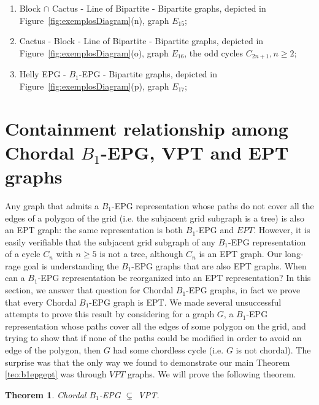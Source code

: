 \documentclass[9pt]{entcs}
\newtheorem{teo}[thm]{Theorem}%
\begin{document}
\begin{enumerate}[label=(\arabic*)]
      \item Block $\cap$  Cactus -  Line of Bipartite - Bipartite graphs, depicted in Figure~\ref{fig:exemplosDiagram}(n), graph $E_{15}$;%
      \item Cactus - Block -  Line of Bipartite - Bipartite graphs, depicted in Figure~\ref{fig:exemplosDiagram}(o), graph $E_{16}$, the odd cycles $C_{2n+1},n\geq 2$;%
      \item Helly EPG - $B_1$-EPG  - Bipartite graphs, depicted in Figure~\ref{fig:exemplosDiagram}(p), graph  $E_{17}$;%
\end{enumerate}








\section{Containment relationship among Chordal $B_1$-EPG, VPT and EPT graphs }


 Any graph that
admits a $B_1$-EPG representation  whose paths do not cover all the edges of a polygon of the grid (i.e.
the subjacent grid subgraph is a tree)  is also an EPT graph: the same representation is both $B_1$-EPG and $EPT$.
However, it is easily verifiable that the subjacent grid subgraph of any $B_1$-EPG representation of a cycle $C_n$ with $n\geq 5$ is not a tree,
although $C_n$ is an  EPT graph.  Our long-rage goal is 
understanding the $B_1$-EPG graphs that are also EPT graphs. When can a $B_1$-EPG representation
be reorganized into an EPT representation?  In this section,
 we answer that question for Chordal $B_1$-EPG graphs, in fact we prove that every Chordal $B_1$-EPG graph is EPT. We
 made several unsuccessful attempts to prove this result by considering for a graph $G$, a $B_1$-EPG representation whose paths cover all the edges
 of some polygon on the grid, and trying  to show  that if none of the paths could be modified in order to avoid an edge of the polygon,
 then $G$ had some chordless  cycle (i.e. $G$ is not chordal). The surprise was that the only way we found to demonstrate our main Theorem \ref{teo:b1epgept} was through $VPT$ graphs.
 We will prove the following theorem.

\begin{teo}\label{teo:chordalB1inVPT}
Chordal $B_1$-EPG $\subsetneq$ VPT. 
\end{teo}
\end{document}
